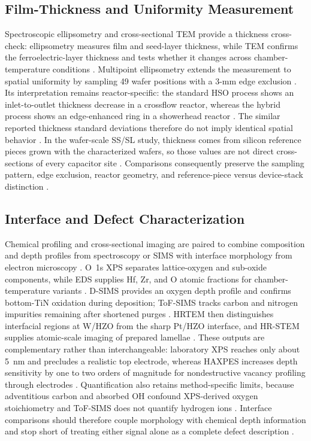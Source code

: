 \documentclass[11pt,a4paper]{report}
\begin{document}
\subsection{Film-Thickness and Uniformity Measurement}

Spectroscopic ellipsometry and cross-sectional TEM provide a thickness cross-check: ellipsometry measures film and seed-layer thickness, while TEM confirms the ferroelectric-layer thickness and tests whether it changes across chamber-temperature conditions \cite{park2022chamber,park2023seed}. Multipoint ellipsometry extends the measurement to spatial uniformity by sampling 49 wafer positions with a 3-mm edge exclusion \cite{neuber2022peald}. Its interpretation remains reactor-specific: the standard HSO process shows an inlet-to-outlet thickness decrease in a crossflow reactor, whereas the hybrid process shows an edge-enhanced ring in a showerhead reactor \cite{neuber2022peald}. The similar reported thickness standard deviations therefore do not imply identical spatial behavior \cite{neuber2022peald}. In the wafer-scale SS/SL study, thickness comes from silicon reference pieces grown with the characterized wafers, so those values are not direct cross-sections of every capacitor site \cite{kaatranen2026unif}. Comparisons consequently preserve the sampling pattern, edge exclusion, reactor geometry, and reference-piece versus device-stack distinction \cite{neuber2022peald,kaatranen2026unif}.
\subsection{Interface and Defect Characterization}

Chemical profiling and cross-sectional imaging are paired to combine composition and depth profiles from spectroscopy or SIMS with interface morphology from electron microscopy \cite{park2022chamber,kim2020tin,liu2025zrrich,kashir2021wake}. O~1s XPS separates lattice-oxygen and sub-oxide components, while EDS supplies Hf, Zr, and O atomic fractions for chamber-temperature variants \cite{park2022chamber}. D-SIMS provides an oxygen depth profile and confirms bottom-TiN oxidation during deposition; ToF-SIMS tracks carbon and nitrogen impurities remaining after shortened purges \cite{kim2020tin,choi2025purge}. HRTEM then distinguishes interfacial regions at W/HZO from the sharp Pt/HZO interface, and HR-STEM supplies atomic-scale imaging of prepared lamellae \cite{liu2025zrrich,kashir2021wake}. These outputs are complementary rather than interchangeable: laboratory XPS reaches only about 5~nm and precludes a realistic top electrode, whereas HAXPES increases depth sensitivity by one to two orders of magnitude for nondestructive vacancy profiling through electrodes \cite{schroeder2023road}. Quantification also retains method-specific limits, because adventitious carbon and absorbed OH confound XPS-derived oxygen stoichiometry and ToF-SIMS does not quantify hydrogen ions \cite{choi2025purge}. Interface comparisons should therefore couple morphology with chemical depth information and stop short of treating either signal alone as a complete defect description \cite{schroeder2023road,choi2025purge,kashir2021wake}.
\end{document}
